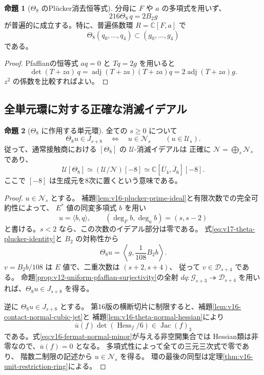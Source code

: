\documentclass[a4paper,11pt]{ltjsarticle}
\theoremstyle{definition}
\newtheorem{theorem}{命題}[section]
\newtheorem{proposition}[theorem]{命題}
\begin{document}
\begin{proposition}[$\Theta_8$ のPl\"ucker消去恒等式]
\label{prop:v17-theta-plucker-identity}
分母に $F$ や $a$ の多項式を用いず、
\begin{equation}\label{eq:v17-theta-plucker-identity}
 216\Theta_8\,q=2B_2g
\end{equation}
が普遍的に成立する。特に、普遍係数環 $R=\mathbb C[F,a]$ で
\[
 \Theta_8(q_0,\ldots,q_4)\subset(g_0,\ldots,g_4)
\]
である。
\end{proposition}

\begin{proof}
Pfaffianの恒等式 $aq=0$ と $Tq=2g$ を用いると
\[
 \det(T+za)\,q
 =\operatorname{adj}(T+za)(T+za)q
 =2\operatorname{adj}(T+za)g.
\]
$z^2$ の係数を比較すればよい。
\end{proof}

\subsection{全単元環に対する正確な消滅イデアル}

\begin{theorem}[$\Theta_8$ に作用する単元環]
\label{thm:v17-theta-unit-annihilator}
全ての $s\ge0$ について
\begin{equation}\label{eq:v17-theta-unit-annihilator}
 \Theta_8u\in J_{s+8}
 \quad\Longleftrightarrow\quad
 u\in\mathcal N_s
 \qquad(u\in\mathcal U_s).
\end{equation}
従って、通常接触商における $[\Theta_8]$ の $\mathcal U$-消滅イデアルは
正確に $\mathcal N=\bigoplus_s\mathcal N_s$ であり、
\[
 \mathcal U[\Theta_8]\simeq(\mathcal U/\mathcal N)[-8]
 \simeq\mathbb C[\overline U_4,\overline J_6][-8].
\]
ここで $[-8]$ は生成元を8次に置くという意味である。
\end{theorem}

\begin{proof}
$u\in\mathcal N_s$ とする。
補題\ref{lem:v16-plucker-prime-ideal}と有限次数での完全可約性によって、
$E^*$ 値の同変多項式 $b$ を用い
\[
 u=\langle b,q\rangle,\qquad
 (\deg_Fb,\deg_ab)=(s,s-2)
\]
と書ける。$s<2$ なら、この次数のイデアル部分は零である。
式\eqref{eq:v17-theta-plucker-identity}と $B_2$ の対称性から
\[
 \Theta_8u=\left\langle g,\frac1{108}B_2b\right\rangle.
\]
$v=B_2b/108$ は $E$ 値で、二重次数は $(s+2,s+4)$、
従って $v\in\mathcal D_{s+4}$ である。
命題\ref{prop:v12-uniform-pfaffian-surjectivity}の全射
$dq:\mathcal G_{s+3}\twoheadrightarrow\mathcal D_{s+4}$
を用いれば、$\Theta_8u\in J_{s+8}$ を得る。

逆に $\Theta_8u\in J_{s+8}$ とする。
第16版の横断切片に制限すると、補題\ref{lem:v16-contact-normal-cubic-jet}と
補題\ref{lem:v16-theta-normal-hessian}により
\[
 \overline u(f)\det(\operatorname{Hess}_f/6)
 \in\operatorname{Jac}(f)_3
\]
である。式\eqref{eq:v16-fermat-normal-minor}が与える非空開集合では
Hessian類は非零なので、$\overline u(f)=0$ となる。
多項式性によって全ての三元三次式で零であり、
階数二制限の記述から $u\in\mathcal N_s$ を得る。
環の最後の同型は定理\ref{thm:v16-unit-restriction-ring}による。
\end{proof}
\end{document}
